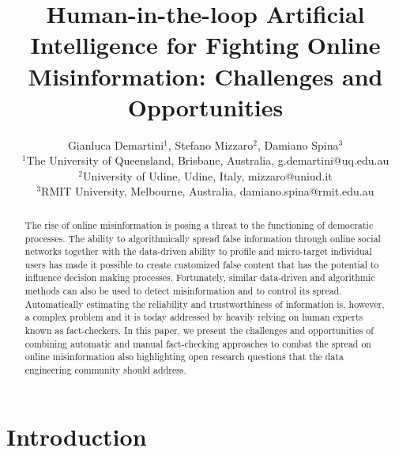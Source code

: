 \documentclass[11pt]{article}
\begin{document}
\title{Human-in-the-loop Artificial Intelligence for Fighting Online Misinformation: Challenges and Opportunities}

\author{Gianluca Demartini$^1$, Stefano Mizzaro$^2$, Damiano Spina$^3$\\
$^1$The University of Queensland, Brisbane, Australia, g.demartini@uq.edu.au\\
$^2$University of Udine, Udine, Italy, mizzaro@uniud.it\\
$^3$RMIT University, Melbourne, Australia, damiano.spina@rmit.edu.au}


\date{}


\maketitle
\vspace{-0.2in}
\begin{abstract}
The rise of online misinformation is posing a threat to the functioning of democratic processes. The ability to algorithmically spread false information through online social networks together with the data-driven ability to profile and micro-target individual users has made it possible to create customized false content that has the potential to influence decision making processes.
% 
Fortunately, similar data-driven and algorithmic methods can also be used to detect misinformation and to control its spread. Automatically estimating the reliability and trustworthiness of information is, however, a complex problem and it is today addressed by heavily relying on human experts known as fact-checkers.
% 
In this paper, we present the challenges and opportunities of combining automatic and manual fact-checking approaches to combat the spread on online misinformation also highlighting open research questions that the data engineering community should address.
\end{abstract}

\section{Introduction}
\end{document}
